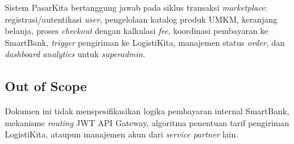 Sistem PasarKita bertanggung jawab pada siklus transaksi \textit{marketplace}:
registrasi/autentikasi \textit{user}, pengelolaan katalog produk UMKM, keranjang
belanja, proses \textit{checkout} dengan kalkulasi \textit{fee}, koordinasi
pembayaran ke SmartBank, \textit{trigger} pengiriman ke LogistiKita, manajemen
status \textit{order}, dan \textit{dashboard analytics} untuk \textit{superadmin}.

\subsection{Out of Scope}

Dokumen ini tidak menspesifikasikan logika pembayaran internal SmartBank,
mekanisme \textit{routing} JWT API Gateway, algoritma penentuan tarif pengiriman
LogistiKita, ataupun manajemen akun dari \textit{service partner} lain.

